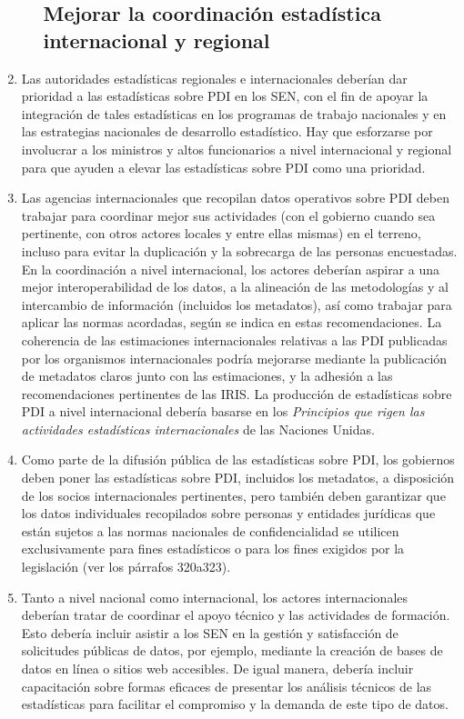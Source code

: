 \documentclass[
]{book}
\begin{document}
\begin{enumerate}
\begin{enumerate}
{    \subsection{Mejorar la coordinación estadística internacional y regional}\label{mejorar-la-coordinaciuxf3n-estaduxedstica-internacional-y-regional}}
  \end{enumerate}
\item
  Las autoridades estadísticas regionales e internacionales deberían dar prioridad a las estadísticas sobre PDI en los SEN, con el fin de apoyar la integración de tales estadísticas en los programas de trabajo nacionales y en las estrategias nacionales de desarrollo estadístico. Hay que esforzarse por involucrar a los ministros y altos funcionarios a nivel internacional y regional para que ayuden a elevar las estadísticas sobre PDI como una prioridad.
\item
  Las agencias internacionales que recopilan datos operativos sobre PDI deben trabajar para coordinar mejor sus actividades (con el gobierno cuando sea pertinente, con otros actores locales y entre ellas mismas) en el terreno, incluso para evitar la duplicación y la sobrecarga de las personas encuestadas. En la coordinación a nivel internacional, los actores deberían aspirar a una mejor interoperabilidad de los datos, a la alineación de las metodologías y al intercambio de información (incluidos los metadatos), así como trabajar para aplicar las normas acordadas, según se indica en estas recomendaciones. La coherencia de las estimaciones internacionales relativas a las PDI publicadas por los organismos internacionales podría mejorarse mediante la publicación de metadatos claros junto con las estimaciones, y la adhesión a las recomendaciones pertinentes de las IRIS. La producción de estadísticas sobre PDI a nivel internacional debería basarse en los \emph{Principios que rigen las actividades estadísticas internacionales} de las Naciones Unidas.
\item
  Como parte de la difusión pública de las estadísticas sobre PDI, los gobiernos deben poner las estadísticas sobre PDI, incluidos los metadatos, a disposición de los socios internacionales pertinentes, pero también deben garantizar que los datos individuales recopilados sobre personas y entidades jurídicas que están sujetos a las normas nacionales de confidencialidad se utilicen exclusivamente para fines estadísticos o para los fines exigidos por la legislación (ver los párrafos 320a323).
\item
  Tanto a nivel nacional como internacional, los actores internacionales deberían tratar de coordinar el apoyo técnico y las actividades de formación. Esto debería incluir asistir a los SEN en la gestión y satisfacción de solicitudes públicas de datos, por ejemplo, mediante la creación de bases de datos en línea o sitios web accesibles. De igual manera, debería incluir capacitación sobre formas eficaces de presentar los análisis técnicos de las estadísticas para facilitar el compromiso y la demanda de este tipo de datos.

\end{enumerate}
\end{document}
